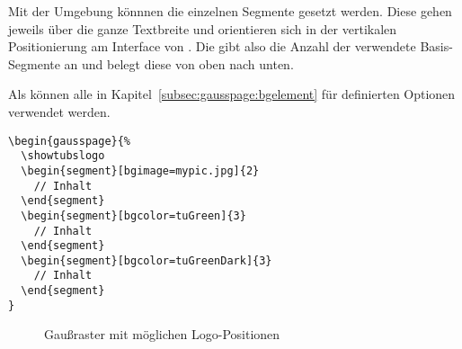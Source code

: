 Mit der Umgebung  könnnen die einzelnen
Segmente gesetzt werden.
Diese gehen jeweils über die ganze Textbreite und orientieren sich
in der vertikalen Positionierung am Interface von .
Die  gibt also die Anzahl der verwendete Basis-Segmente an
und belegt diese von oben nach unten.

Als  können alle in Kapitel~\ref{subsec:gausspage:bgelement}
für  definierten Optionen verwendet werden. %


\begin{lstlisting}[captionpos=b,caption={Beispiel-Nutzung von gausspage}]
\begin{gausspage}{%
  \showtubslogo
  \begin{segment}[bgimage=mypic.jpg]{2}
    // Inhalt
  \end{segment}
  \begin{segment}[bgcolor=tuGreen]{3}
    // Inhalt
  \end{segment}
  \begin{segment}[bgcolor=tuGreenDark]{3}
    // Inhalt
  \end{segment}
}
\end{lstlisting}

\begin{figure}\centering
  \begin{minipage}{0.35\textwidth}
    \label{fig:gausspage:topsender}
  \end{minipage}
  \quad
  \begin{minipage}{0.35\textwidth}
    \label{fig:gausspage:bottomsender}
  \end{minipage}
  \caption{Gaußraster mit möglichen Logo-Positionen}\label{fig:gausspage}
\end{figure}
